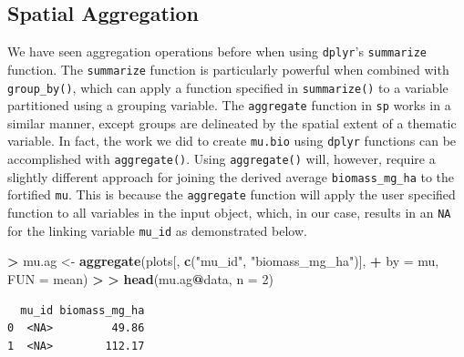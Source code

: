 \documentclass[]{krantz}
\makeatletter
\newenvironment{Shaded}{\begin{snugshade}}{\end{snugshade}}
\newcommand{\KeywordTok}[1]{\textcolor[rgb]{0.27,0.27,0.27}{\textbf{#1}}}
\newcommand{\DataTypeTok}[1]{\textcolor[rgb]{0.27,0.27,0.27}{#1}}
\newcommand{\DecValTok}[1]{\textcolor[rgb]{0.06,0.06,0.06}{#1}}
\newcommand{\StringTok}[1]{\textcolor[rgb]{0.5,0.5,0.5}{#1}}
\newcommand{\OperatorTok}[1]{\textcolor[rgb]{0.43,0.43,0.43}{\textbf{#1}}}
\newcommand{\ErrorTok}[1]{\textcolor[rgb]{0.14,0.14,0.14}{\textbf{#1}}}
\newcommand{\NormalTok}[1]{#1}
\newenvironment{kframe}{%
\medskip{}
\setlength{\fboxsep}{.8em}
 \def\at@end@of@kframe{}%
 \ifinner\ifhmode%
  \def\at@end@of@kframe{\end{minipage}}%
  \begin{minipage}{\columnwidth}%
 \fi\fi%
 \def\FrameCommand##1{\hskip\@totalleftmargin \hskip-\fboxsep
 \colorbox{shadecolor}{##1}\hskip-\fboxsep
     \hskip-\linewidth \hskip-\@totalleftmargin \hskip\columnwidth}%
 \MakeFramed {\advance\hsize-\width
   \@totalleftmargin\z@ \linewidth\hsize
   \@setminipage}}%
 {\par\unskip\endMakeFramed%
 \at@end@of@kframe}
\renewenvironment{Shaded}{\begin{kframe}}{\end{kframe}}
\theoremstyle{definition}
\theoremstyle{definition}
\theoremstyle{definition}
\theoremstyle{remark}
\makeatother
\begin{document}
\subsection{Spatial Aggregation}\label{spatial-aggregation}

We have seen aggregation operations before when using \texttt{dplyr}'s
\texttt{summarize} function. The \texttt{summarize} function is
particularly powerful when combined with \texttt{group\_by()}, which can
apply a function specified in \texttt{summarize()} to a variable
partitioned using a grouping variable. The \texttt{aggregate} function
in \texttt{sp} works in a similar manner, except groups are delineated
by the spatial extent of a thematic variable. In fact, the work we did
to create \texttt{mu.bio} using \texttt{dplyr} functions can be
accomplished with \texttt{aggregate()}. Using \texttt{aggregate()} will,
however, require a slightly different approach for joining the derived
average \texttt{biomass\_mg\_ha} to the fortified \texttt{mu}. This is
because the \texttt{aggregate} function will apply the user specified
function to all variables in the input object, which, in our case,
results in an \texttt{NA} for the linking variable \texttt{mu\_id} as
demonstrated below.

\begin{Shaded}
\begin{Highlighting}[]
\OperatorTok{>}\StringTok{ }\NormalTok{mu.ag <-}\StringTok{ }\KeywordTok{aggregate}\NormalTok{(plots[, }\KeywordTok{c}\NormalTok{(}\StringTok{"mu_id"}\NormalTok{, }\StringTok{"biomass_mg_ha"}\NormalTok{)], }
\OperatorTok{+}\StringTok{   }\DataTypeTok{by =}\NormalTok{ mu, }\DataTypeTok{FUN =}\NormalTok{ mean)}
\OperatorTok{>}\StringTok{ }
\ErrorTok{>}\StringTok{ }\KeywordTok{head}\NormalTok{(mu.ag}\OperatorTok{@}\NormalTok{data, }\DataTypeTok{n =} \DecValTok{2}\NormalTok{)}
\end{Highlighting}
\end{Shaded}

\begin{verbatim}
  mu_id biomass_mg_ha
0  <NA>         49.86
1  <NA>        112.17
\end{verbatim}
\end{document}
